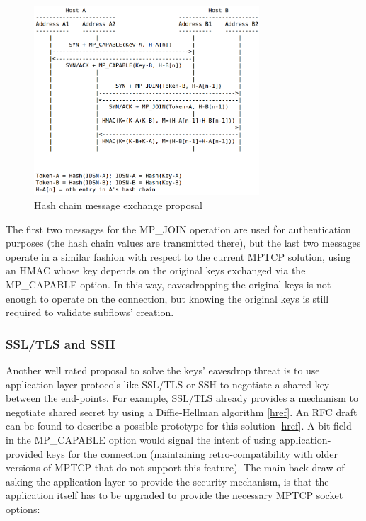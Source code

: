 \begin{figure}[!htb]
\centering
\includegraphics[width=0.75\textwidth]{images/hashchain}
\caption{Hash chain message exchange proposal}
\label{fig:hashchain}
\end{figure}
  
The first two messages for the MP\_JOIN operation are used for authentication purposes (the hash chain values are transmitted there), but the last two messages operate in a similar fashion with respect to the current MPTCP solution, using an HMAC whose key depends on the original keys exchanged via the MP\_CAPABLE option. In this way, eavesdropping the original keys is not enough to operate on the connection, but knowing the original keys is still required to validate subflows' creation.

\subsubsection{SSL/TLS and SSH}
Another well rated proposal to solve the keys' eavesdrop threat is to use application-layer protocols like SSL/TLS or SSH to negotiate a shared key between the end-points. For example, SSL/TLS already provides a mechanism to negotiate shared secret by using a Diffie-Hellman algorithm [\href{https://wiki.openssl.org/index.php/Diffie_Hellman#Diffie-Hellman_in_SSL.2FTLS}{href}].
  An RFC draft can be found to describe a possible prototype for this solution [\href{http://tools.ietf.org/html/draft-paasch-mptcp-ssl-00}{href}]. A bit field in the MP\_CAPABLE option would signal the intent of using application-provided keys for the connection (maintaining retro-compatibility with older versions of MPTCP that do not support this feature).
The main back draw of asking the application layer to provide the security mechanism, is that the application itself has to be upgraded to provide the necessary MPTCP socket options:

